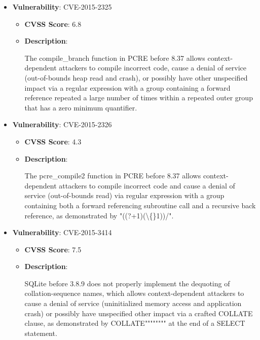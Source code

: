 \documentclass{article}
\begin{document}
\begin{itemize}
        \item \textbf{Vulnerability}: CVE-2015-2325
        \begin{itemize}
            \item \textbf{CVSS Score}:  6.8 
            \item \textbf{Description}:
            \parbox[t]{0.9\linewidth}{
                \ttfamily The compile\_branch function in PCRE before 8.37 allows context-dependent attackers to compile incorrect code, cause a denial of service (out-of-bounds heap read and crash), or possibly have other unspecified impact via a regular expression with a group containing a forward reference repeated a large number of times within a repeated outer group that has a zero minimum quantifier.
            }
        \end{itemize}
    
        \item \textbf{Vulnerability}: CVE-2015-2326
        \begin{itemize}
            \item \textbf{CVSS Score}:  4.3 
            \item \textbf{Description}:
            \parbox[t]{0.9\linewidth}{
                \ttfamily The pcre\_compile2 function in PCRE before 8.37 allows context-dependent attackers to compile incorrect code and cause a denial of service (out-of-bounds read) via regular expression with a group containing both a forward referencing subroutine call and a recursive back reference, as demonstrated by "((?+1)(\textbackslash\{\}1))/".
            }
        \end{itemize}
    
        \item \textbf{Vulnerability}: CVE-2015-3414
        \begin{itemize}
            \item \textbf{CVSS Score}:  7.5 
            \item \textbf{Description}:
            \parbox[t]{0.9\linewidth}{
                \ttfamily SQLite before 3.8.9 does not properly implement the dequoting of collation-sequence names, which allows context-dependent attackers to cause a denial of service (uninitialized memory access and application crash) or possibly have unspecified other impact via a crafted COLLATE clause, as demonstrated by COLLATE"""""""" at the end of a SELECT statement.
            }
        \end{itemize}
    

\end{itemize}
\end{document}
